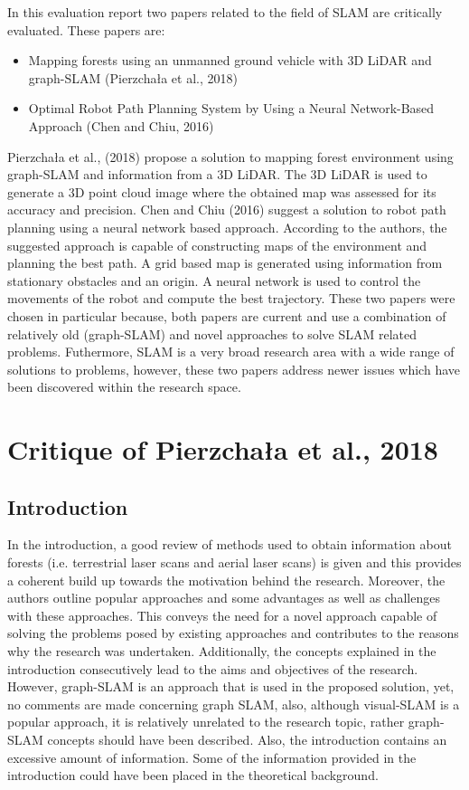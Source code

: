 \documentclass[a4paper, 12pt]{article}
\begin{document}
In this evaluation report two papers related to the field of SLAM are critically evaluated. These papers are: 

\begin{itemize}
 \item{Mapping forests using an unmanned ground vehicle with 3D LiDAR and graph-SLAM (Pierzchała et al., 2018)}
 \item{Optimal Robot Path Planning System by Using a Neural Network-Based Approach (Chen and Chiu, 2016)}
\end{itemize}

 Pierzchała et al., (2018) propose a solution to mapping forest environment using graph-SLAM and information from a 3D LiDAR. The 3D LiDAR is used to generate a 3D point cloud image where the obtained map was assessed for its accuracy and precision. Chen and Chiu (2016) suggest a solution to robot path planning using a neural network based approach. According to the authors, the suggested approach is capable of constructing maps of the environment and planning the best path. A grid based map is generated using information from stationary obstacles and an origin. A neural network is used to control the movements of the robot and compute the best trajectory. These two papers were chosen in particular because, both papers are current and use a combination of relatively old (graph-SLAM) and novel approaches to solve SLAM related problems. Futhermore, SLAM is a very broad research area with a wide range of solutions to problems, however, these two papers address newer issues which have been discovered within the research space. 

\newpage 
\section{Critique of Pierzchała et al., 2018}

\subsection{Introduction}
In the introduction, a good review of methods used to obtain information about forests (i.e. terrestrial laser scans and aerial laser scans) is given and this provides a coherent build up towards the motivation behind the research. Moreover, the authors outline popular approaches and some advantages as well as  challenges with these approaches. This conveys the need for a novel approach capable of solving the problems posed by existing approaches and contributes to the reasons why the research was undertaken. Additionally, the concepts explained in the introduction consecutively lead to the aims and objectives of the research. However, graph-SLAM is an approach that is used in the proposed solution, yet, no comments are made concerning graph SLAM, also, although visual-SLAM is a popular approach, it is relatively unrelated to the research topic, rather graph-SLAM concepts should have been described. Also, the introduction contains an excessive amount of information. Some of the information provided in the introduction could have been placed in the theoretical background.
\end{document}
